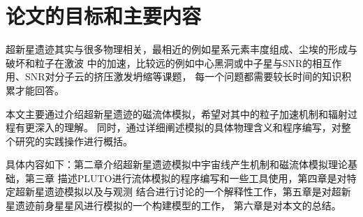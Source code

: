 \section{论文的目标和主要内容}
\label{Aim}
超新星遗迹其实与很多物理相关，最相近的例如星系元素丰度组成、尘埃的形成与破坏和粒子在激波
中的加速，比较远的例如中心黑洞或中子星与SNR的相互作用、SNR对分子云的挤压激发坍缩等课题，
每一个问题都需要较长时间的知识积累才能回答。

本文主要通过介绍超新星遗迹的磁流体模拟，希望对其中的粒子加速机制和辐射过程有更深入的理解。
同时，通过详细阐述模拟的具体物理含义和程序编写，对整个研究的实践操作进行概括。

具体内容如下：第二章介绍超新星遗迹模拟中宇宙线产生机制和磁流体模拟理论基础，第三章
描述PLUTO进行流体模拟的程序编写和一些工具使用，第四章是对特定超新星遗迹模拟以及与观测
结合进行讨论的一个解释性工作，第五章是对超新星遗迹前身星星风进行模拟的一个构建模型的工作，
第六章是对本文的总结。
